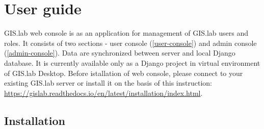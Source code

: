 \chapter{User guide}
\label{user-guide}

GIS.lab web console is as an application for management of GIS.lab users and roles. It consists of two sections - user console (\ref{user-console}) and admin console (\ref{admin-console}). Data are synchronized between  server and local Django database. It is currently available only as a Django project in virtual environment of GIS.lab Desktop. Before istallation of web console, please connect to your existing GIS.lab server or install it on the basis of this instruction: \href{https://gislab.readthedocs.io/en/latest/installation/index.html}{https://gislab.readthedocs.io/en/latest/installation/\linebreak index.html}.

\section{Installation}
\label{installation}

